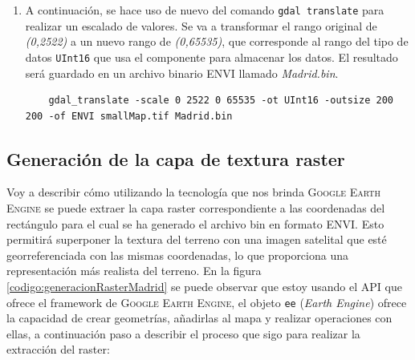 \documentclass[a4paper, 11pt]{book}
\begin{document}
\begin{enumerate}
    \item A continuación, se hace uso de nuevo del comando \texttt{gdal translate} para realizar un escalado de valores. Se va a transformar el rango original de \emph{(0,2522)} a un nuevo rango de \emph{(0,65535)}, que corresponde al rango del tipo de datos \texttt{UInt16} que usa el componente para almacenar los datos. El resultado será guardado en un archivo binario \textsc{ENVI} llamado \emph{Madrid.bin}.

    {\scriptsize
    \begin{verbatim}
    gdal_translate -scale 0 2522 0 65535 -ot UInt16 -outsize 200 200 -of ENVI smallMap.tif Madrid.bin
    \end{verbatim}
    }
\end{enumerate}

\subsection{Generación de la capa de textura raster}
\label{sec:raster}
Voy a describir cómo utilizando la tecnología que nos brinda \textsc{Google Earth Engine} se puede extraer la capa \gls{raster} correspondiente a las coordenadas del rectángulo para el cual se ha generado el archivo bin en formato \textsc{ENVI}. Esto permitirá superponer la textura del terreno con una imagen satelital que esté georreferenciada con las mismas coordenadas, lo que proporciona una representación más realista del terreno.
En la figura \ref{codigo:generacionRasterMadrid} se puede observar que estoy usando el \textsc{API} que ofrece el \gls{framework} de \textsc{Google Earth Engine}, el objeto \texttt{ee} (\emph{Earth Engine}) ofrece la capacidad de crear geometrías, añadirlas al mapa y realizar operaciones con ellas, a continuación paso a describir el proceso que sigo para realizar la extracción del raster:
\end{document}
